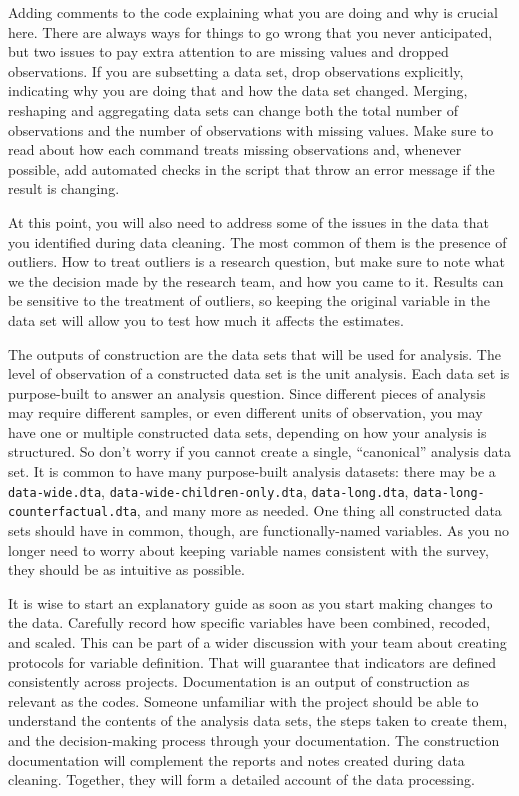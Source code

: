 Adding comments to the code explaining what you are doing and why is crucial here.
There are always ways for things to go wrong that you never anticipated, but two issues to pay extra attention to are missing values and dropped observations. 
If you are subsetting a data set, drop observations explicitly, indicating why you are doing that and how the data set changed.
Merging, reshaping and aggregating data sets can change both the total number of observations and the number of observations with missing values.
Make sure to read about how each command treats missing observations and, whenever possible, add automated checks in the script that throw an error message if the result is changing.

At this point, you will also need to address some of the issues in the data that you identified during data cleaning. 
The most common of them is the presence of outliers.
How to treat outliers is a research question, but make sure to note what we the decision made by the research team, and how you came to it. 
Results can be sensitive to the treatment of outliers, so keeping the original variable in the data set will allow you to test how much it affects the estimates.


The outputs of construction are the data sets that will be used for analysis.
The level of observation of a constructed data set is the unit analysis. 
Each data set is purpose-built to answer an analysis question.
Since different pieces of analysis may require different samples,
or even different units of observation,
you may have one or multiple constructed data sets, 
depending on how your analysis is structured.
So don't worry if you cannot create a single, ``canonical'' analysis data set.
It is common to have many purpose-built analysis datasets:
there may be a \texttt{data-wide.dta},
\texttt{data-wide-children-only.dta}, \texttt{data-long.dta},
\texttt{data-long-counterfactual.dta}, and many more as needed.
One thing all constructed data sets should have in common, though,
are functionally-named variables.
As you no longer need to worry about keeping variable names
consistent with the survey, they should be as intuitive as possible.

It is wise to start an explanatory guide as soon as you start making changes to the data.
Carefully record how specific variables have been combined, recoded, and scaled. 
This can be part of a wider discussion with your team about creating protocols for variable definition.
That will guarantee that indicators are defined consistently across projects.
Documentation is an output of construction as relevant as the codes.
Someone unfamiliar with the project should be able to understand the contents of the analysis data sets, the steps taken to create them, and the decision-making process through your documentation.
The construction documentation will complement the reports and notes created during data cleaning.
Together, they will form a detailed account of the data processing.



